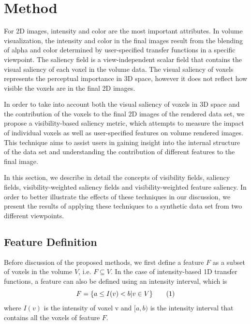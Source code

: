 \section{Method}
For 2D images, intensity and color are the most important attributes. In volume visualization, the intensity and color in the final images result from the blending of alpha and color determined by user-specified transfer functions in a specific viewpoint.
The saliency field is a view-independent scalar field that contains the visual saliency of each voxel in the volume data. The visual saliency of voxels represents the perceptual importance in 3D space, however it does not reflect how visible the voxels are in the final 2D images.

In order to take into account both the visual saliency of voxels in 3D space and the contribution of the voxels to the final 2D images of the rendered data set, we propose a visibility-based saliency metric, which attempts to measure the impact of individual voxels as well as user-specified features on volume rendered images.
This technique aims to assist users in gaining insight into the internal structure of the data set and understanding the contribution of different features to the final image.



In this section, we describe in detail the concepts of visibility fields, saliency fields, visibility-weighted saliency fields and visibility-weighted feature saliency. In order to better illustrate the effects of these techniques in our discussion, we present the results of applying these techniques to a synthetic data set from two different viewpoints.

\subsection{Feature Definition \label{feature_definition}}
Before discussion of the proposed methods, we first define a feature $ F $ as a subset of voxels in the volume $ V $, i.e. $ F\subseteq V $.
In the case of intensity-based 1D transfer functions, a feature can also be defined using an intensity interval, which is
\[ F=\{ a \leq I(v) <b | v \in V \} 
\addtag \]
where $ I(v) $ is the intensity of voxel v and $ [a,b) $ is the intensity interval that contains all the voxels of feature $F$.

